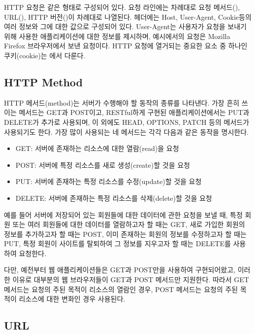 HTTP 요청은 \과 같은 형태로 구성되어 있다. 요청 라인에는 차례대로 요청 메서드(), URL(), HTTP 버전()이 차례대로 나열된다. 헤더에는 Host, User-Agent, Cookie등의 여러 정보와 그에 대한 값으로 구성되어 있다. User-Agent는 사용자가 요청을 보내기 위해 사용한 애플리케이션에 대한 정보를 제시하며, 예시에서의 요청은 Mozilla Firefox 브라우저에서 보낸 요청이다. HTTP 요청에 열거되는 중요한 요소 중 하나인 쿠키(cookie)는 에서 다룬다.

\subsection*{HTTP Method}

HTTP 메서드(method)는 서버가 수행해야 할 동작의 종류를 나타낸다. 가장 흔히 쓰이는 메서드는 GET과 POST이고, RESTful하게 구현된 애플리케이션에서는 PUT과 DELETE가 추가로 사용되며, 이 외에도 HEAD, OPTIONS, PATCH 등의 메서드가 사용되기도 한다. 가장 많이 사용되는 네 메서드는 각각 다음과 같은 동작을 명시한다.

\begin{itemize}
    \item GET: 서버에 존재하는 리소스에 대한 열람(read)을 요청
    \item POST: 서버에 특정 리소스를 새로 생성(create)할 것을 요청
    \item PUT: 서버에 존재하는 특정 리소스를 수정(update)할 것을 요청
    \item DELETE: 서버에 존재하는 특정 리소스를 삭제(delete)할 것을 요청
\end{itemize}

예를 들어 서버에 저장되어 있는 회원들에 대한 데이터에 관한 요청을 보낼 때, 특정 회원 또는 여러 회원들에 대한 데이터를 열람하고자 할 때는 GET, 새로 가입한 회원의 정보를 추가하고자 할 때는 POST, 이미 존재하는 회원의 정보를 수정하고자 할 때는 PUT, 특정 회원이 사이트를 탈퇴하여 그 정보를 지우고자 할 때는 DELETE를 사용하여 요청한다.

다만, 예전부터 웹 애플리케이션들은 GET과 POST만을 사용하여 구현되어왔고, 이러한 이유로 대부분의 웹 브라우저들이 GET과 POST 메서드만 지원한다. 따라서 GET 메서드는 요청의 주된 목적이 리소스의 열람인 경우, POST 메서드는 요청의 주된 목적이 리소스에 대한 변화인 경우 사용된다.

\subsection*{URL}

